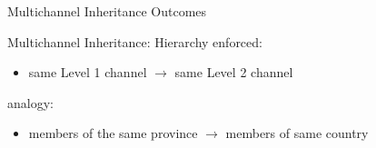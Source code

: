 \begin{frame}{Multichannel Inheritance Outcomes}
  
\end{frame}

\begin{frame}{Multichannel Inheritance: Hierarchy}%
  enforced:
  \begin{itemize}
    \item same Level 1 channel $\rightarrow$ same Level 2 channel
  \end{itemize}

  \vspace{2ex}
  analogy:
  \begin{itemize}
    \item members of the same province $\rightarrow$ members of same country
  \end{itemize}

\end{frame}
